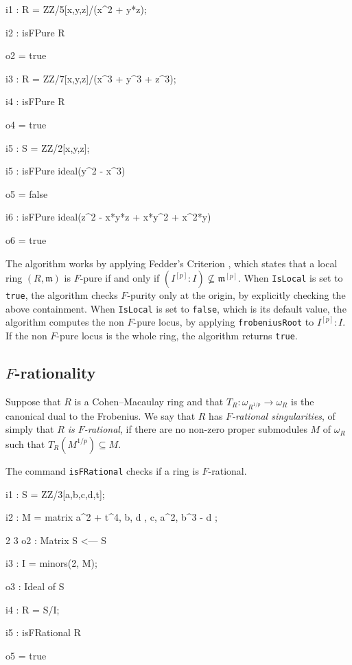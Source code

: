 \documentclass{amsart}
\begin{document}
\medskip
{\small{}
\begin{MyVerbatim}
i1 : R = ZZ/5[x,y,z]/(x^2 + y*z);

i2 : isFPure R

o2 = true

i3 : R = ZZ/7[x,y,z]/(x^3 + y^3 + z^3);

i4 : isFPure R

o4 = true

i5 : S = ZZ/2[x,y,z];

i5 : isFPure ideal(y^2 - x^3)

o5 = false

i6 : isFPure ideal(z^2 - x*y*z + x*y^2 + x^2*y)

o6 = true
\end{MyVerbatim}
}\medskip


The algorithm works by applying Fedder's Criterion {\cite{FedderFPureRat}}, which states that a
local ring $(R, \mathfrak{m})$ is $F$-pure if and only if $(I^{[p]} : I)
\not\subseteq \mathfrak{m}^{[p]}$.
When \texttt{IsLocal} is set to \texttt{true}, the algorithm checks $F$-purity only at the origin, by explicitly checking the above
containment. When \texttt{IsLocal} is set to \texttt{false}, which is its default value, the
algorithm computes the non $F$-pure locus, by applying \texttt{frobeniusRoot}
to $I^{[p]} :I$. If the non $F$-pure locus is the whole ring, the algorithm
returns \texttt{true}.


\subsection{$F$-rationality}

\begin{definition}
Suppose that $R$ is a Cohen--Macaulay ring and that $T_{R} :
\omega_{R^{1/p}} \rightarrow \omega_{R}$ is the canonical dual to the
Frobenius. We say that $R$ has \emph{$F$-rational singularities}, of simply that \emph{$R$ is $F$-rational}, if there
are no non-zero proper submodules $M$ of $\omega_{R}$ such that
$T_{R}(M^{1/p}) \subseteq M$.
\end{definition}

The command \texttt{isFRational} checks if a ring is $F$-rational.

\medskip
{\small{}
\begin{MyVerbatim}
i1 : S = ZZ/3[a,b,c,d,t];

i2 : M = matrix{{ a^2 + t^4, b, d }, { c, a^2, b^3 - d }};

             2       3
o2 : Matrix S  <--- S

i3 : I = minors(2, M);

o3 : Ideal of S

i4 : R = S/I;

i5 : isFRational R

o5 = true
\end{MyVerbatim}
}\medskip
\end{document}
